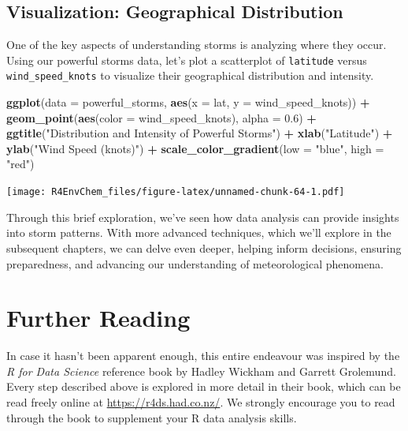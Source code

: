 \documentclass[
]{book}
\newenvironment{Shaded}{\begin{snugshade}}{\end{snugshade}}
\newcommand{\AttributeTok}[1]{\textcolor[rgb]{0.13,0.29,0.53}{#1}}
\newcommand{\FloatTok}[1]{\textcolor[rgb]{0.00,0.00,0.81}{#1}}
\newcommand{\FunctionTok}[1]{\textcolor[rgb]{0.13,0.29,0.53}{\textbf{#1}}}
\newcommand{\NormalTok}[1]{#1}
\newcommand{\SpecialCharTok}[1]{\textcolor[rgb]{0.81,0.36,0.00}{\textbf{#1}}}
\newcommand{\StringTok}[1]{\textcolor[rgb]{0.31,0.60,0.02}{#1}}
\begin{document}
\hypertarget{visualization-geographical-distribution}{%
\subsection{Visualization: Geographical Distribution}\label{visualization-geographical-distribution}}

One of the key aspects of understanding storms is analyzing where they occur. Using our powerful storms data, let's plot a scatterplot of \texttt{latitude} versus \texttt{wind\_speed\_knots} to visualize their geographical distribution and intensity.

\begin{Shaded}
\begin{Highlighting}[]
\FunctionTok{ggplot}\NormalTok{(}\AttributeTok{data =}\NormalTok{ powerful\_storms, }\FunctionTok{aes}\NormalTok{(}\AttributeTok{x =}\NormalTok{ lat, }\AttributeTok{y =}\NormalTok{ wind\_speed\_knots)) }\SpecialCharTok{+}
  \FunctionTok{geom\_point}\NormalTok{(}\FunctionTok{aes}\NormalTok{(}\AttributeTok{color =}\NormalTok{ wind\_speed\_knots), }\AttributeTok{alpha =} \FloatTok{0.6}\NormalTok{) }\SpecialCharTok{+}
  \FunctionTok{ggtitle}\NormalTok{(}\StringTok{"Distribution and Intensity of Powerful Storms"}\NormalTok{) }\SpecialCharTok{+}
  \FunctionTok{xlab}\NormalTok{(}\StringTok{"Latitude"}\NormalTok{) }\SpecialCharTok{+}
  \FunctionTok{ylab}\NormalTok{(}\StringTok{"Wind Speed (knots)"}\NormalTok{) }\SpecialCharTok{+}
  \FunctionTok{scale\_color\_gradient}\NormalTok{(}\AttributeTok{low =} \StringTok{"blue"}\NormalTok{, }\AttributeTok{high =} \StringTok{"red"}\NormalTok{)}
\end{Highlighting}
\end{Shaded}

\texttt{[image: R4EnvChem\_files/figure-latex/unnamed-chunk-64-1.pdf]}

Through this brief exploration, we've seen how data analysis can provide insights into storm patterns. With more advanced techniques, which we'll explore in the subsequent chapters, we can delve even deeper, helping inform decisions, ensuring preparedness, and advancing our understanding of meteorological phenomena.

\hypertarget{further-reading-1}{%
\section{Further Reading}\label{further-reading-1}}

In case it hasn't been apparent enough, this entire endeavour was inspired by the \emph{R for Data Science} reference book by Hadley Wickham and Garrett Grolemund. Every step described above is explored in more detail in their book, which can be read freely online at \url{https://r4ds.had.co.nz/}. We strongly encourage you to read through the book to supplement your R data analysis skills.
\end{document}
